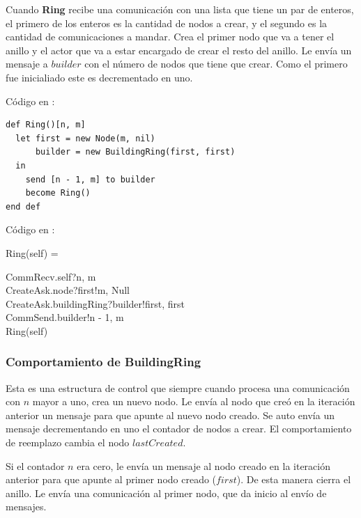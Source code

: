 Cuando \textbf{Ring} recibe una comunicación con una lista que tiene un par de enteros, el primero de los enteros es la cantidad de nodos a crear, y el segundo es la cantidad de comunicaciones a mandar. Crea el primer nodo que va a tener el anillo y el actor que va a estar encargado de crear el resto del anillo. Le envía un mensaje a $builder$ con el número de nodos que tiene que crear. Como el primero fue inicialiado este es decrementado en uno.

Código en \SAL:

\begin{lstlisting}[language=sal, style=simple]
def Ring()[n, m]
  let first = new Node(m, nil)
      builder = new BuildingRing(first, first) 
  in
    send [n - 1, m] to builder
    become Ring() 
end def
\end{lstlisting}

Código en \CSP:

\begin{process}
Ring(self) = \\ \quad
  \begin{block}
  CommRecv.self?\langle n, m \rangle \then \\
  CreateAsk.node?first!\langle m, Null \rangle \then \\
  CreateAsk.buildingRing?builder!\langle first, first \rangle \then \\
  CommSend.builder!\langle n - 1, m\rangle \then \\
  Ring(self)
  \end{block}
\end{process}

\subsubsection*{Comportamiento de BuildingRing}

Esta es una estructura de control que siempre cuando procesa una comunicación con $n$ mayor a uno, crea un nuevo nodo. Le envía al nodo que creó en la iteración anterior un mensaje para que apunte al nuevo nodo creado. Se auto envía un mensaje decrementando en uno el contador de nodos a crear. El comportamiento de reemplazo cambia el nodo $lastCreated$.

Si el contador $n$ era cero, le envía un mensaje al nodo creado en la iteración anterior para que apunte al primer nodo creado ($first$). De esta manera cierra el anillo. Le envía una comunicación al primer nodo, que da inicio al envío de mensajes. 

